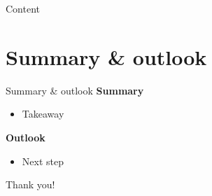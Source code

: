 \begin{frame}{Content}
\end{frame}

\section{Summary \& outlook}
\begin{frame}{Summary \& outlook}
  \textbf{Summary}
  \begin{itemize}
    \item Takeaway
  \end{itemize}
  \vspace{0.5em}
  \textbf{Outlook}
  \begin{itemize}
    \item Next step
  \end{itemize}
  \vfill
  \centering
  {\Large Thank you!\par}
\end{frame}
